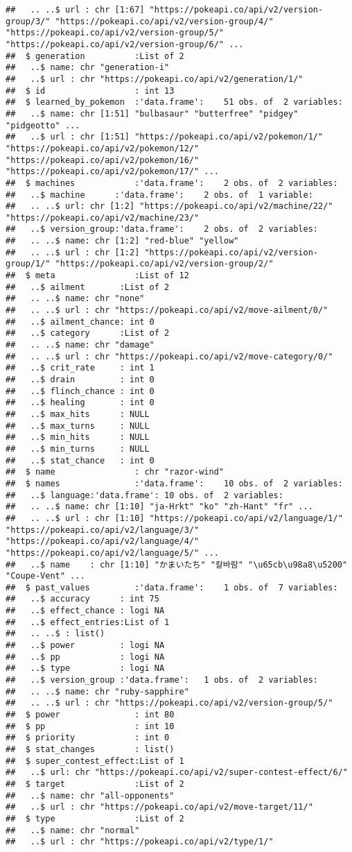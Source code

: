 \documentclass[
  12pt,
]{article}
\begin{document}
\begin{verbatim}
##   .. ..$ url : chr [1:67] "https://pokeapi.co/api/v2/version-group/3/" "https://pokeapi.co/api/v2/version-group/4/" "https://pokeapi.co/api/v2/version-group/5/" "https://pokeapi.co/api/v2/version-group/6/" ...
##  $ generation          :List of 2
##   ..$ name: chr "generation-i"
##   ..$ url : chr "https://pokeapi.co/api/v2/generation/1/"
##  $ id                  : int 13
##  $ learned_by_pokemon  :'data.frame':    51 obs. of  2 variables:
##   ..$ name: chr [1:51] "bulbasaur" "butterfree" "pidgey" "pidgeotto" ...
##   ..$ url : chr [1:51] "https://pokeapi.co/api/v2/pokemon/1/" "https://pokeapi.co/api/v2/pokemon/12/" "https://pokeapi.co/api/v2/pokemon/16/" "https://pokeapi.co/api/v2/pokemon/17/" ...
##  $ machines            :'data.frame':    2 obs. of  2 variables:
##   ..$ machine      :'data.frame':    2 obs. of  1 variable:
##   .. ..$ url: chr [1:2] "https://pokeapi.co/api/v2/machine/22/" "https://pokeapi.co/api/v2/machine/23/"
##   ..$ version_group:'data.frame':    2 obs. of  2 variables:
##   .. ..$ name: chr [1:2] "red-blue" "yellow"
##   .. ..$ url : chr [1:2] "https://pokeapi.co/api/v2/version-group/1/" "https://pokeapi.co/api/v2/version-group/2/"
##  $ meta                :List of 12
##   ..$ ailment       :List of 2
##   .. ..$ name: chr "none"
##   .. ..$ url : chr "https://pokeapi.co/api/v2/move-ailment/0/"
##   ..$ ailment_chance: int 0
##   ..$ category      :List of 2
##   .. ..$ name: chr "damage"
##   .. ..$ url : chr "https://pokeapi.co/api/v2/move-category/0/"
##   ..$ crit_rate     : int 1
##   ..$ drain         : int 0
##   ..$ flinch_chance : int 0
##   ..$ healing       : int 0
##   ..$ max_hits      : NULL
##   ..$ max_turns     : NULL
##   ..$ min_hits      : NULL
##   ..$ min_turns     : NULL
##   ..$ stat_chance   : int 0
##  $ name                : chr "razor-wind"
##  $ names               :'data.frame':    10 obs. of  2 variables:
##   ..$ language:'data.frame': 10 obs. of  2 variables:
##   .. ..$ name: chr [1:10] "ja-Hrkt" "ko" "zh-Hant" "fr" ...
##   .. ..$ url : chr [1:10] "https://pokeapi.co/api/v2/language/1/" "https://pokeapi.co/api/v2/language/3/" "https://pokeapi.co/api/v2/language/4/" "https://pokeapi.co/api/v2/language/5/" ...
##   ..$ name    : chr [1:10] "かまいたち" "칼바람" "\u65cb\u98a8\u5200" "Coupe-Vent" ...
##  $ past_values         :'data.frame':    1 obs. of  7 variables:
##   ..$ accuracy      : int 75
##   ..$ effect_chance : logi NA
##   ..$ effect_entries:List of 1
##   .. ..$ : list()
##   ..$ power         : logi NA
##   ..$ pp            : logi NA
##   ..$ type          : logi NA
##   ..$ version_group :'data.frame':   1 obs. of  2 variables:
##   .. ..$ name: chr "ruby-sapphire"
##   .. ..$ url : chr "https://pokeapi.co/api/v2/version-group/5/"
##  $ power               : int 80
##  $ pp                  : int 10
##  $ priority            : int 0
##  $ stat_changes        : list()
##  $ super_contest_effect:List of 1
##   ..$ url: chr "https://pokeapi.co/api/v2/super-contest-effect/6/"
##  $ target              :List of 2
##   ..$ name: chr "all-opponents"
##   ..$ url : chr "https://pokeapi.co/api/v2/move-target/11/"
##  $ type                :List of 2
##   ..$ name: chr "normal"
##   ..$ url : chr "https://pokeapi.co/api/v2/type/1/"
\end{verbatim}
\end{document}
